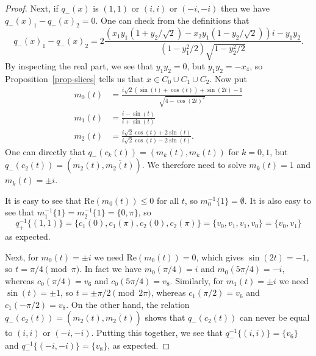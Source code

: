 \documentclass[reqno]{amsart}
\newcommand{\ov}[1]     {\overline{#1}}
\newcommand{\rt}        {\sqrt{2}}
\renewcommand{\:}{\colon}
\theoremstyle{definition}
\begin{document}
\begin{proof}
 Next, if $q_-(x)$ is $(1,1)$ or $(i,i)$ or $(-i,-i)$ then we have
 $q_-(x)_1-q_-(x)_2=0$.  One can check from the definitions that
 \[ q_-(x)_1 - q_-(x)_2 =
  2\frac{(x_1y_1(1+y_2/\rt)-x_2y_1(1-y_2/\rt))i-y_1y_2}{
   (1-y_1^2/2)\sqrt{1-y_2^2/2}}.
 \]
 By inspecting the real part, we see that $y_1y_2=0$, but
 $y_1y_2=-x_4$, so Proposition~\ref{prop-slices} tells us that
 $x\in C_0\cup C_1\cup C_2$.  Now put
 \begin{align*}
  m_0(t) &=
   \frac{i \rt (\sin(t)+\cos(t))+\sin(2t)-1}{\sqrt{4-\cos(2 t)^2}} \\
  m_1(t) &=
   \frac{i - \sin(t)}{i + \sin(t)} \\
  m_2(t) &=
   \frac{i \rt \cos(t)+2 \sin(t)}{i \rt \cos(t)-2 \sin(t)}.
 \end{align*}
 One can directly that $q_-(c_k(t))=(m_k(t),m_k(t))$
 for $k=0,1$, but $q_-(c_2(t))=(m_2(t),\ov{m_2(t)})$.  We therefore
 need to solve $m_k(t)=1$ and $m_k(t)=\pm i$.

 It is easy to see that $\text{Re}(m_0(t))\leq 0$ for all $t$, so
 $m_0^{-1}\{1\}=\emptyset$.  It is also easy to see that
 $m_1^{-1}\{1\}=m_2^{-1}\{1\}=\{0,\pi\}$, so
 \[ q_+^{-1}\{(1,1)\} = \{c_1(0),c_1(\pi),c_2(0),c_2(\pi)\}
     = \{v_0,v_1,v_1,v_0\} = \{v_0,v_1\}
 \]
 as expected.

 Next, for $m_0(t)=\pm i$ we need $\text{Re}(m_0(t))=0$, which gives
 $\sin(2t)=-1$, so $t=\pi/4\pmod{\pi}$.  In fact we have
 $m_0(\pi/4)=i$ and $m_0(5\pi/4)=-i$, whereas $c_0(\pi/4)=v_6$ and
 $c_0(5\pi/4)=v_8$.  Similarly, for $m_1(t)=\pm i$ we need
 $\sin(t)=\pm 1$, so $t=\pm\pi/2\pmod{2\pi}$, whereas $c_1(\pi/2)=v_6$
 and $c_1(-\pi/2)=v_8$.  On the other hand, the relation
 $q_-(c_2(t))=(m_2(t),\ov{m_2(t)})$ shows that $q_-(c_2(t))$ can never
 be equal to $(i,i)$ or $(-i,-i)$.  Putting this together, we see that
 $q_-^{-1}\{(i,i)\}=\{v_6\}$ and $q_-^{-1}\{(-i,-i)\}=\{v_8\}$, as
 expected.
\end{proof}
\end{document}
